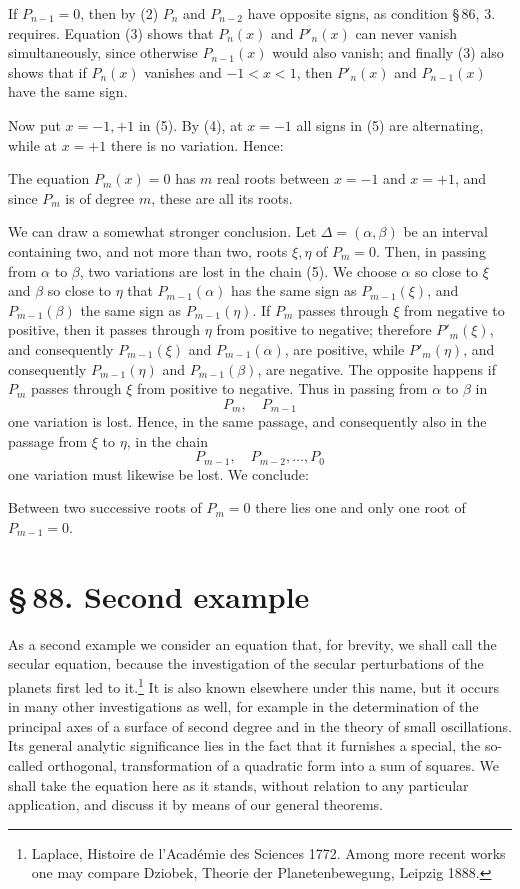 \documentclass[11pt]{article}
\providecommand{\sect}[2]{\section*{\S\,#1. #2}}
\begin{document}
If $P_{n-1}=0$, then by (2) $P_n$ and $P_{n-2}$ have opposite signs, as condition \S\,86, 3. requires. Equation (3) shows that $P_n(x)$ and $P'_n(x)$ can never vanish simultaneously, since otherwise $P_{n-1}(x)$ would also vanish; and finally (3) also shows that if $P_n(x)$ vanishes and $-1<x<1$, then $P'_n(x)$ and $P_{n-1}(x)$ have the same sign.

Now put $x=-1,+1$ in (5). By (4), at $x=-1$ all signs in (5) are alternating, while at $x=+1$ there is no variation. Hence:

The equation $P_m(x)=0$ has $m$ real roots between $x=-1$ and $x=+1$, and since $P_m$ is of degree $m$, these are all its roots.

We can draw a somewhat stronger conclusion. Let $\Delta=(\alpha,\beta)$ be an interval containing two, and not more than two, roots $\xi,
\eta$ of $P_m=0$. Then, in passing from $\alpha$ to $\beta$, two variations are lost in the chain (5). We choose $\alpha$ so close to $\xi$ and $\beta$ so close to $\eta$ that $P_{m-1}(\alpha)$ has the same sign as $P_{m-1}(\xi)$, and $P_{m-1}(\beta)$ the same sign as $P_{m-1}(\eta)$. If $P_m$ passes through $\xi$ from negative to positive, then it passes through $\eta$ from positive to negative; therefore $P'_m(\xi)$, and consequently $P_{m-1}(\xi)$ and $P_{m-1}(\alpha)$, are positive, while $P'_m(\eta)$, and consequently $P_{m-1}(\eta)$ and $P_{m-1}(\beta)$, are negative. The opposite happens if $P_m$ passes through $\xi$ from positive to negative. Thus in passing from $\alpha$ to $\beta$ in
\[
        P_m,
        \quad P_{m-1}
\]
one variation is lost. Hence, in the same passage, and consequently also in the passage from $\xi$ to $\eta$, in the chain
\[
        P_{m-1},
        \quad P_{m-2},
        \ldots,
        P_0
\]
one variation must likewise be lost. We conclude:

Between two successive roots of $P_m=0$ there lies one and only one root of $P_{m-1}=0$.

\sect{88}{Second example}

As a second example we consider an equation that, for brevity, we shall call the secular equation, because the investigation of the secular perturbations of the planets first led to it.\footnote{Laplace, Histoire de l'Acad\'emie des Sciences 1772. Among more recent works one may compare Dziobek, Theorie der Planetenbewegung, Leipzig 1888.} It is also known elsewhere under this name, but it occurs in many other investigations as well, for example in the determination of the principal axes of a surface of second degree and in the theory of small oscillations. Its general analytic significance lies in the fact that it furnishes a special, the so-called orthogonal, transformation of a quadratic form into a sum of squares. We shall take the equation here as it stands, without relation to any particular application, and discuss it by means of our general theorems.
\end{document}
